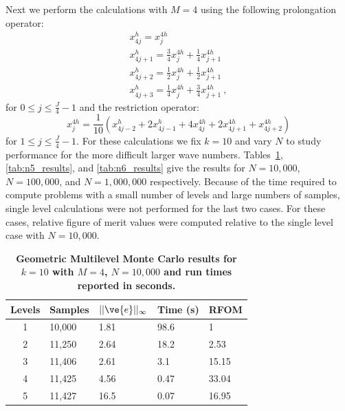 \documentclass[note]{TechNote}
\begin{document}
Next we perform the calculations with $M=4$ using the following
prolongation operator:
\begin{subequations}
  \begin{gather}
    x^h_{4j} = x_j^{4h} \\
    x^h_{4j+1} = \frac{3}{4} x_j^{4h} + \frac{1}{4} x_{j+1}^{4h}\:\\
    x^h_{4j+2} = \frac{1}{2} x_j^{4h} + \frac{1}{2} x_{j+1}^{4h}\:\\
    x^h_{4j+3} = \frac{1}{4} x_j^{4h} + \frac{3}{4} x_{j+1}^{4h}\:,
  \end{gather}
  \label{eq:m4_prolongation}
\end{subequations}
for $0 \leq j \leq \frac{J}{4} - 1$ and the restriction operator:
\begin{equation}
  x^{4h}_j = \frac{1}{10} ( x_{4j-2}^{h} + 2 x_{4j-1}^{h} + 4
  x_{4j}^{4h} + 2 x_{4j+1}^{4h} + x_{4j+2}^{4h} )
  \label{eq:m4_restriction}
\end{equation}
for $1 \leq j \leq \frac{J}{4} - 1$. For these calculations we fix
$k=10$ and vary $N$ to study performance for the more difficult larger
wave numbers. Tables~\ref{tab:n4_results}, \ref{tab:n5_results}, and
\ref{tab:n6_results} give the results for $N=10,000$, $N=100,000$, and
$N=1,000,000$ respectively. Because of the time required to compute
problems with a small number of levels and large numbers of samples,
single level calculations were not performed for the last two
cases. For these cases, relative figure of merit values were computed
relative to the single level case with $N=10,000$.
\begin{table}[h!]
  \begin{center}
    \begin{tabular}{cllll}\hline\hline
      \multicolumn{1}{c}{\textbf{Levels}} & 
      \multicolumn{1}{l}{\textbf{Samples}} & 
      \multicolumn{1}{l}{\textbf{$||\ve{e}||_{\infty}$}} & 
      \multicolumn{1}{l}{\textbf{Time (s)}} & 
      \multicolumn{1}{l}{\textbf{RFOM}} \\
      \hline
      1 & 10,000 & 1.81 & 98.6 & 1 \\
      2 & 11,250 & 2.64 & 18.2 & 2.53 \\
      3 & 11,406 & 2.61 & 3.1 & 15.15 \\
      4 & 11,425 & 4.56 & 0.47 & 33.04 \\
      5 & 11,427 & 16.5 & 0.07 & 16.95 \\
      \hline\hline
    \end{tabular}
  \end{center}
  \caption{\textbf{Geometric Multilevel Monte Carlo results for $k =
      10$ with $M = 4$, $N = 10,000$ and run times reported in
      seconds.}}
  \label{tab:n4_results}
\end{table}
\end{document}
